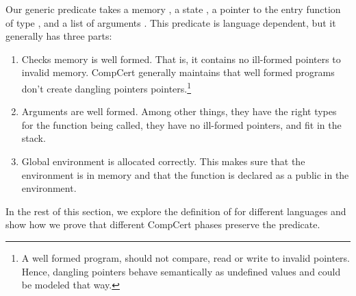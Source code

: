 Our generic predicate  takes a memory , a state , a pointer to the entry function  of type , and a list of arguments . This predicate is language dependent, but it generally has three parts:
\begin{enumerate}
\item Checks memory is well formed. That is, it contains no ill-formed pointers to invalid memory. CompCert generally maintains that well formed programs don't create dangling pointers pointers.\footnote{A well formed program, should not compare, read or write to invalid pointers. Hence, dangling pointers behave semantically as undefined values and could be modeled that way.}
\item Arguments are well formed. Among other things, they have the right types for the function being called, they have no ill-formed pointers, and fit in the stack. 
\item Global environment is allocated correctly. This makes sure that the environment is in memory and that the function is declared as a public in the environment.
\end{enumerate}
In the rest of this section, we explore the definition of  for different languages and show how we prove that different CompCert phases preserve the predicate.


